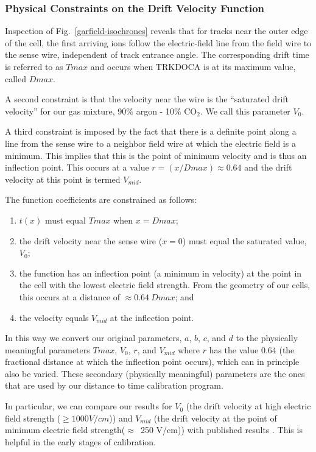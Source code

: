 \subsubsection{Physical Constraints on the Drift Velocity Function}

Inspection of Fig.~\ref{garfield-isochrones} reveals that for tracks near the outer
edge of the cell, the first arriving ions follow the electric-field line from 
the field wire to the sense wire, independent of track entrance angle.  The
corresponding drift time is referred to as $Tmax$ and occurs when TRKDOCA is at its maximum value,
called $Dmax$.

A second constraint is that the velocity near the wire is the ``saturated drift velocity'' for our gas
mixture, 90$\%$ argon - 10$\%$ CO$_2$.  We call this parameter $V_0$.

A third constraint is imposed by the fact that there is a definite point along
a line from the sense wire to a neighbor field wire at which the electric field 
is a minimum. This implies that this is the point
of minimum velocity and is thus an inflection point. This occurs at a value
$r = (x/Dmax) \approx 0.64$ and the drift velocity at this point is termed $V_{mid}$.

The function coefficients are constrained as follows:
\begin{enumerate}
\item  $t(x)$ must equal $Tmax$ when $x = Dmax $;
\item  the drift velocity near the sense wire ($x = 0$)
must equal the saturated value, $V_0$;
\item the function has an inflection point (a
minimum in velocity) at the point in the cell with the lowest electric field
strength.  From the geometry of our cells, this occurs at a distance
of $\approx 0.64 ~Dmax$; and
\item the velocity equals $V_{mid}$ at the inflection point.
\end{enumerate}

In this way we convert our original parameters, $a$, $b$, $c$, and $d$ to the physically meaningful
parameters $Tmax$, $V_0$, $r$, and $V_{mid}$ where $r$ has the value 0.64 (the fractional distance
at which the inflection point occurs), which can in principle also be varied.
These secondary (physically meaningful) parameters are the ones that are used
by our distance to time calibration program.

In particular, we can compare our results for $V_0$ (the drift velocity at high electric field strength
($\geq 1000 V/cm$)) and $V_{mid}$ (the drift velocity at the point of minimum electric field strength($\approx$~250 V/cm))
with published results \cite{drift-velocity-results}.  This is helpful in the early stages of calibration.

